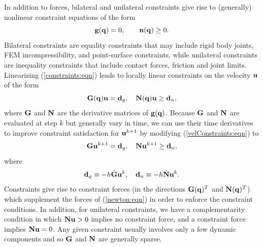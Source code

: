 In addition to forces, bilateral and unilateral constraints give rise to
(generally) nonlinear constraint equations of the form
%
\begin{equation}
{\bf g}({\bf q}) = 0, \qquad {\bf n}({\bf q}) \ge 0.
\label{constraints:eqn}
\end{equation}
%
Bilateral constraints are equality constraints that may include rigid body
joints, FEM incompressibility, and point-surface constraints, while unilateral
constraints are inequality constraints that include contact forces, friction
and joint limits. Linearizing (\ref{constraints:eqn}) leads to locally linear
constraints on the velocity ${\bf u}$ of the form
%
\begin{equation}
{\bf G}({\bf q}) {\bf u} = {\bf d}_g, \quad {\bf N}({\bf q}) {\bf u} \ge {\bf d}_n,
\label{velConstraints:eqn}
\end{equation}
%
where ${\bf G}$ and ${\bf N}$ are the derivative matrices of ${\bf g}({\bf q})$. Because ${\bf G}$ and
${\bf N}$ are evaluated at step $k$ but generally vary in time, we can use their
time derivatives to improve constraint satisfaction for ${\bf u}^{k+1}$ by modifying
(\ref{velConstraints:eqn}) to
%
\begin{equation}
{\bf G} {\bf u}^{k+1} = {\bf d}_g, \quad {\bf N} {\bf u}^{k+1} \ge {\bf d}_n,
\label{stepConstraints:eqn}
\end{equation}
%
where
%
\begin{equation}
{\bf d}_g \equiv -h \dot{{\bf G}} {\bf u}^k, \quad {\bf d}_n \equiv -h \dot{{\bf N}} {\bf u}^k.
\label{constraintDerivs:eqn}
\end{equation}
%
Constraints give rise to constraint forces (in the directions ${\bf G}({\bf q})^T$ and
${\bf N}({\bf q})^T$) which supplement the forces of (\ref{newton:eqn}) in order to
enforce the constraint conditions.  In addition, for unilateral constraints, we
have a complementarity condition in which ${\bf N} {\bf u} > 0$ implies no constraint
force, and a constraint force implies ${\bf N} {\bf u} = 0$.  Any given constraint
usually involves only a few dynamic components and so ${\bf G}$ and ${\bf N}$ are
generally sparse.

